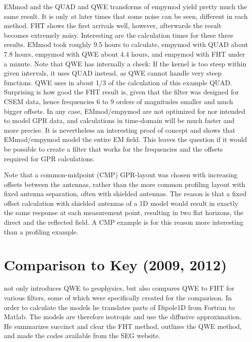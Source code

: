 \documentclass[manuscript,revised]{geophysics}
\begin{document}
EMmod and the QUAD and QWE transforms of empymod yield pretty much the same
result. It is only at later times that some noise can be seen, different in
each method. FHT shows the first arrivals well, however, afterwards the result
becomes extremely noisy.
%
%
Interesting are the calculation times for these three results. EMmod took
roughly 9.5 hours to calculate, empymod with QUAD about 7.8 hours, empymod with
QWE about 4.4 hours, and empymod with FHT under a minute. Note that QWE has
internally a check: If the kernel is too steep within given intervals, it uses
QUAD instead, as QWE cannot handle very steep functions. QWE uses in about 1/3
of the calculation of this example QUAD. Surprising is how good the FHT result
is, given that the filter was designed for CSEM data, hence frequencies 6 to 9
orders of magnitudes smaller and much bigger offsets. In any case,
EMmod/empymod are not optimized for nor intended to model GPR data, and
calculations in time-domain will be much faster and more precise. It is
nevertheless an interesting proof of concept and shows that EMmod/empymod model
the entire EM field. This leaves the question if it would be possible to create
a filter that works for the frequencies and the offsets required for GPR
calculations.

Note that a common-midpoint (CMP) GPR-layout was chosen with increasing offsets
between the antennas, rather than the more common profiling layout with fixed
antenna separation, often with shielded antennas. The reason is that a fixed
offset calculation with shielded antennas of a 1D model would result in exactly
the same response at each measurement point, resulting in two flat horizons,
the direct and the reflected field. A CMP example is for this reason more
interesting than a profiling example.


\section{Comparison to Key (2009, 2012)}

\cite{GEO.12.Key} not only introduces QWE to geophysics, but also compares QWE
to FHT for various filters, some of which were specifically created for the
comparison. In order to calculate the models he translates parts of Dipole1D
\citep{GEO.09.Key} from Fortran to Matlab. The models are therefore isotropic
and use the diffusive approximation. He summarizes succinct and clear the FHT
method, outlines the QWE method, and made the codes available from the SEG
website.
\end{document}
